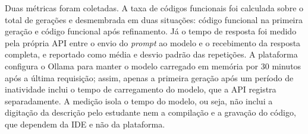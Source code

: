 Duas métricas foram coletadas. A taxa de códigos funcionais foi calculada sobre o total de gerações e desmembrada em duas situações: código funcional na primeira geração e código funcional após refinamento. Já o tempo de resposta foi medido pela própria API entre o envio do \textit{prompt} ao modelo e o recebimento da resposta completa, e reportado como média e desvio padrão das repetições. A plataforma configura o Ollama para manter o modelo carregado em memória por 30 minutos após a última requisição; assim, apenas a primeira geração após um período de inatividade inclui o tempo de carregamento do modelo, que a API registra separadamente. A medição isola o tempo do modelo, ou seja, não inclui a digitação da descrição pelo estudante nem a compilação e a gravação do código, que dependem da IDE e não da plataforma.
